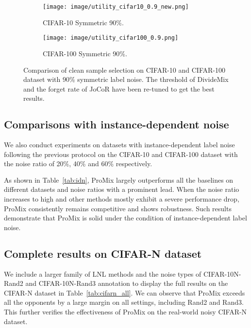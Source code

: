 \documentclass{article}
\begin{document}
\begin{figure}[!t]
     \centering
     \begin{subfigure}{0.49\linewidth}
         \texttt{[image: image/utility\_cifar10\_0.9\_new.png]}
         \caption{CIFAR-10 Symmetric 90\%.}
     \end{subfigure}
     \hfill
     \begin{subfigure}{0.49\linewidth}
         \texttt{[image: image/utility\_cifar100\_0.9.png]}
         \caption{CIFAR-100 Symmetric 90\%.}
     \end{subfigure}
     \caption{Comparison of clean sample selection on CIFAR-10 and CIFAR-100 dataset with 90\% symmetric label noise. The threshold of DivideMix and the forget rate of JoCoR have been re-tuned to get the best results.}
     \label{fig:more_uti}
\end{figure}



\subsection{Comparisons with instance-dependent noise}
We also conduct experiments on datasets with instance-dependent label noise following the previous protocol \cite{DBLP:conf/cvpr/ZhuL021} on the CIFAR-10 and CIFAR-100 dataset with the noise ratio of 20\%, 40\% and 60\% respectively.

As shown in Table~\ref{tab:idn}, ProMix largely outperforms all the baselines on different datasets and noise ratios with a prominent lead. When the noise ratio increases to high and other methods mostly exhibit a severe performance drop, ProMix consistently remains competitive and shows robustness. Such results demonstrate that ProMix is solid under the condition of instance-dependent label noise.

\subsection{Complete results on CIFAR-N dataset}
We include a larger family of LNL methods and the noise types of CIFAR-10N-Rand2 and CIFAR-10N-Rand3 annotation to display the full results on the CIFAR-N dataset in Table~\ref{tab:cifarn_all}. We can observe that ProMix exceeds all the opponents by a large margin on all settings, including Rand2 and Rand3. This further verifies the effectiveness of ProMix on the real-world noisy CIFAR-N dataset.
\end{document}
